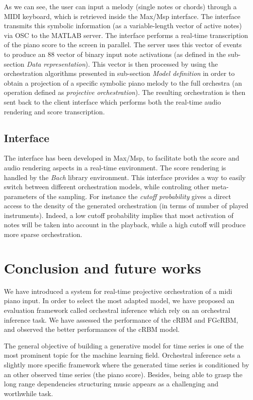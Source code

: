 \documentclass{article}
\begin{document}
As we can see, the user can input a melody (single notes or chords)
through a MIDI keyboard, which is retrieved inside the Max/Msp interface.
The interface transmits this symbolic information (as a variable-length
vector of active notes) via OSC to the MATLAB server. The interface
performs a real-time transcription of the piano score to the screen
in parallel. The server uses this vector of events to produce an 88
vector of binary input note activations (as defined in the sub-section \textit{Data representation}).
This vector is then processed by using the orchestration algorithms
presented in sub-section \textit{Model definition} in order to obtain a projection
of a specific symbolic piano melody to the full orchestra (an operation
defined as \emph{projective orchestration}). The resulting orchestration
is then sent back to the client interface which performs both the
real-time audio rendering and score transcription. 

\subsection{Interface}
The interface has been developed in Max/Msp, to facilitate both the
score and audio rendering aspects in a real-time environment. The
score rendering is handled by the \emph{Bach} library environment. 
This interface provides a way to easily switch between different orchestration models, while controling other
meta-parameters of the sampling. For instance the \emph{cutoff probability
}gives a direct access to the density of the generated orchestration
(in terms of number of played instruments). Indeed, a low cutoff probability
implies that most activation of notes will be taken into account in
the playback, while a high cutoff will produce more sparse orchestration.

\section{Conclusion and future works}
We have introduced a system for real-time projective orchestration of a midi piano input. In order to select the most adapted model, we have proposed an evaluation framework called orchestral inference which rely on an orchestral inference task. We have assessed the performance of the cRBM and FGcRBM, and observed the better performances of the cRBM model.

The general objective of building a generative model for time series is one of the most prominent topic for the machine learning field. Orchestral inference sets a slightly more specific framework where the generated time series is conditioned by an other observed time series (the piano score). Besides, being able to grasp the long range dependencies structuring music appears as a challenging and worthwhile task.
\end{document}
